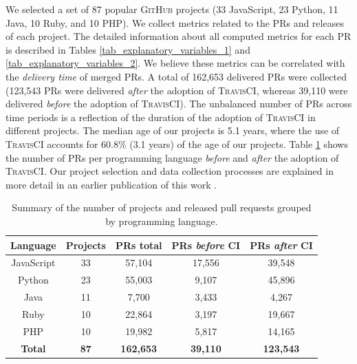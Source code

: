We selected a set of 87 popular \textsc{GitHub} projects (33 JavaScript, 23 Python, 11 Java, 10 Ruby, and 10 PHP). We collect metrics related to the PRs and releases of each project. 
The detailed information about all computed metrics for each PR is described in Tables \ref{tab_explanatory_variables_1} and \ref{tab_explanatory_variables_2}. We believe these metrics can be correlated with the \textit{delivery time} of merged PRs. A total of 162,653 delivered PRs were collected (123,543 PRs were delivered \textit{after} the adoption of \textsc{TravisCI}, whereas 39,110 were delivered \textit{before} the adoption of \textsc{TravisCI}). The unbalanced number of PRs across time periods is a reflection of the duration of the adoption of \textsc{TravisCI} in different projects. The median age of our projects is 5.1 years, where the use of \textsc{TravisCI} accounts for 60.8\% (3.1 years) of the age of our projects. Table \ref{tab:pulls_per_language} shows the number of PRs per programming language \textit{before} and \textit{after} the adoption of \textsc{TravisCI}. Our project selection and data collection processes are explained in more detail in an earlier publication of this work \citep{bernardo2018studying}.

\bgroup
\def\arraystretch{1.1}
\begin{table}[t]
	\centering
	\footnotesize
	\caption{Summary of the number of projects and released pull requests grouped by programming language.}
	\begin{tabular}{|c|c|c|c|c|}
		\hline
		\textbf{Language} & \textbf{Projects} & \textbf{PRs total}  & \textbf{PRs \textit{before} CI} & \textbf{PRs \textit{after} CI} \\
		\hline \hline
		JavaScript   & 33 & 57,104  & 17,556 & 39,548  \\ 
		Python       & 23 & 55,003 & 9,107 & 45,896  \\ 
		Java           & 11 & 7,700   & 3,433 & 4,267    \\ 
		Ruby          & 10 & 22,864 & 3,197 & 19,667  \\ 
		PHP            & 10 & 19,982 & 5,817 & 14,165  \\ 
		\hline
		\textbf{Total} & \textbf{87} & \textbf{162,653}  & \textbf{39,110} & \textbf{123,543} \\ 
		\hline
	\end{tabular}
	\label{tab:pulls_per_language}
\end{table}
\egroup

\bgroup
\def\arraystretch{1}

